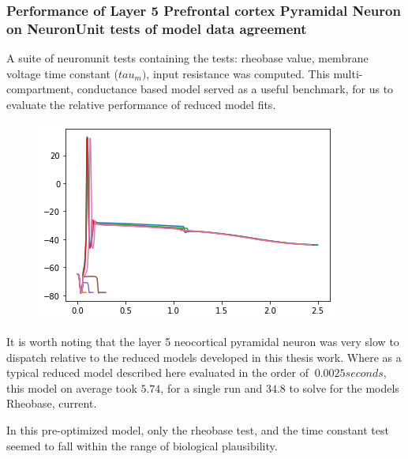 \subsubsection{Performance of Layer 5 Prefrontal cortex Pyramidal Neuron on NeuronUnit tests of model data agreement}

A suite of neuronunit tests containing the tests: rheobase value, membrane voltage time constant ($tau_{m})$, input resistance was computed. This multi-compartment, conductance based model served as a useful benchmark, for us to evaluate the relative performance of reduced model fits.
    
\begin{figure}    
\begin{center}
    \includegraphics[width=0.7\linewidth]{figures/NU_BBP_fusion_L5PC_files/NU_BBP_fusion_L5PC_3_1.png}
\end{center}
\end{figure}  

It is worth noting that the layer 5 neocortical pyramidal neuron was very slow to dispatch relative to the reduced models developed in this thesis work. Where as a typical reduced model described here evaluated in the order of $~0.0025 seconds$, this model on average took $5.74$, for a single run and $34.8$ to solve for the models Rheobase, current.

\begin{table}[ht]
\centering
{}
\end{table}

In this pre-optimized model, only the rheobase test, and the time constant test seemed to fall within the range of biological plausibility.